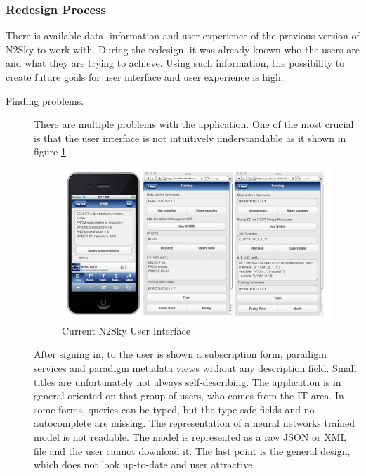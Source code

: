 \subsubsection{Redesign Process }\label{Redesign Process}

There is available data, information and user experience of the previous version of N2Sky to work with. During the redesign, it was already known who the users are and what they are trying to achieve. Using such information, the possibility to create future goals for user interface and user experience is high.


\begin{description}

\item[Finding problems.]  There are multiple problems with the application. One of the most crucial is that the user interface is not intuitively understandable as it shown in figure \ref{fig:old_arch}. 
\begin{figure}[htbp]
\begin{center}
  \includegraphics[width=\linewidth]{components/2/old_arch.png}
  \caption{Current N2Sky User Interface}
  \label{fig:old_arch}
\end{center}
\end{figure}


After signing in, to the user is shown a subscription form, paradigm services and paradigm metadata views without any description field. Small titles are unfortunately not always self-describing. The application is in general oriented on that group of users, who comes from the IT area. In some forms, queries can be typed, but the type-safe fields and no autocomplete are missing.
The representation of a neural networks trained model is not readable. The model is represented as a raw JSON or XML file and the user cannot download it. The last point is the general design, which does not look up-to-date and user attractive. 



\end{description}
